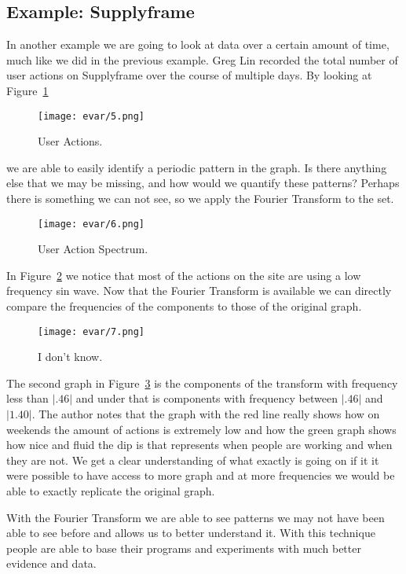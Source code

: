 \documentclass [../article.tex]{subfiles}
\begin{document}
  \subsection{Example: Supplyframe}
  In another example we are going to look at data over a certain
  amount of time, much like we did in the previous example.
  Greg Lin recorded the total number of
  user actions on Supplyframe over the course of multiple days.
  By looking at Figure~\ref{fig:useractions}
  \begin{figure}[htbp]
    \centering
    \texttt{[image: evar/5.png]}
    \caption{User Actions.}
    \label{fig:useractions}
  \end{figure}
  we are able to easily identify a periodic pattern in
  the graph. Is there anything else that we may be missing, and
  how would we quantify these patterns?
  Perhaps there is something we can not see, so we apply the
  Fourier Transform to the set.
  \begin{figure}[htbp]
    \centering
    \texttt{[image: evar/6.png]}
    \caption{User Action Spectrum.}
    \label{fig:actionspectrum}
  \end{figure}
  In Figure~\ref{fig:actionspectrum} we notice that most of the actions
  on the site are using a low frequency sin wave. Now that the Fourier
  Transform is available we can directly compare the frequencies of the
  components to those of the original graph.
  \begin{figure}[htbp]
    \centering
    \texttt{[image: evar/7.png]}
    \caption{I don't know.}
    \label{fig:idk}
  \end{figure}
  The second graph in Figure~\ref{fig:idk} is the components of the
  transform with frequency less than $|.46|$ and under that is
  components with frequency between $|.46|$ and $|1.40|$.  The author
  notes that  the graph with the red line really shows how on
  weekends the amount of actions is extremely low and how the
  green graph shows how nice and fluid the dip is that represents
  when people are working and when they are not. We get a clear
  understanding of what exactly is going on if it it were possible
  to have access to more graph and at more frequencies we would be
  able to exactly replicate the original graph.

  With the Fourier Transform we are able to see patterns we may not
  have been able to see before and allows us to better
  understand it. With this technique people are able to
  base their programs and experiments with much better evidence
  and data.
\end{document}
